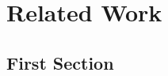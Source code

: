 \chapter{Related Work}
\label{ch:Related_Work}

\section{First Section}
\label{sec:Related_Work:FirstSection}